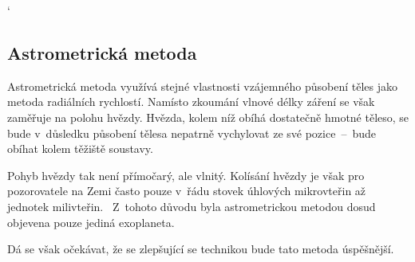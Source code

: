 \documentclass[a4paper,12pt]{article}
\begin{document}
{{ %
\catcode`

\clearpage
\subsection{Astrometrická metoda}

Astrometrická metoda využívá stejné vlastnosti vzájemného působení těles jako metoda radiálních rychlostí. Namísto zkoumání vlnové délky záření se však zaměřuje na polohu hvězdy. Hvězda, kolem níž obíhá dostatečně hmotné těleso, se bude v~důsledku působení tělesa nepatrně vychylovat ze své pozice~--~bude obíhat kolem těžiště soustavy.~\cite{methods}


Pohyb hvězdy tak není přímočarý, ale vlnitý. Kolísání hvězdy je však pro pozorovatele na Zemi často pouze v~řádu stovek úhlových mikrovteřin až jednotek milivteřin.~\cite{methods} Z~tohoto důvodu byla astrometrickou metodou dosud objevena pouze jediná exoplaneta.~\cite{nasadata}

\drawgimp

Dá se však očekávat, že se zlepšující se technikou bude tato metoda úspěšnější.

}}
\end{document}
